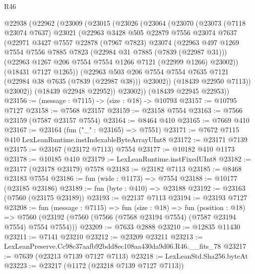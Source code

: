 \begin{lexlean}{R46}
\begin{coremodule}
  @22938
    (@22962
      (@23009
        (@23015
          (@23026
            (@23064
              (@23070
                (@23073
                  (@7118 @23074 @7637)
                  @23021
                  (@22963
                    @3428
                    @505
                    @22879
                    @7556
                    @23074
                    @7637
                    (@22971
                      @3427
                      @7557
                      @22878
                      (@7967 @7823)
                      @23074
                      (@22963
                        @497
                        @1269
                        @7554
                        @7556
                        @7885
                        @7823
                        (@22984 @31 @7885 (@7839 (@22987 @31)))
                        (@22963 @1267 @206 @7554 @7554 @1266 @7121 (@22999 @1266) @23002))
                      (@18431 @7127 @1265))
                    (@22963
                      @503
                      @206
                      @7554
                      @7554
                      @7635
                      @7121
                      (@22984 @38 @7635 (@7839 (@22987 @38)))
                      @23002))
                  (@18439 @22950 @7113))
                @23002))
            (@18439 @22948 @22952))
          @23002))
      (@18439 @22945 @22953))
@23156 := (message : @7115) -> (size : @18) -> @10793
@23157 := @10795 @7127
@23158 := @7568 @23157
@23159 := @23158 @7554
@23163 := @7566 @23159 (@7587 @23157 @7554)
@23164 := @8464 @410
@23165 := @7669 @410
@23167 := @23164 (fun ("_" : @23165) => @7551)
@23171 := @7672 @7115 @410 LexLeanRuntime.instIndexableByteArrayUInt8
@23172 := @23171 @7139
@23175 := @23167 (@23172 @7113) @7554
@23177 := @10182 @410 @1173
@23178 := @10185 @410
@23179 := LexLeanRuntime.instFixedUInt8
@23182 := @23177 (@23178 @23179) @7578
@23183 := @23182 @7113
@23185 := @8468 @23183 @7554
@23186 := fun (wide : @1173) => @7554
@23188 := @10177 (@23185 @23186)
@23189 := fun (byte : @410) => @23188
@23192 := @23163 (@7560 (@23175 @23189))
@23193 := @22137 @7113
@23194 := @23193 @7127
@23208 := fun (message : @7115) =>
  fun (size : @18) =>
  fun (position : @18) =>
  @7560 (@23192 (@7560 (@7566 (@7568 @23194 @7554) (@7587 @23194 @7554) @7554 @7554)))
@23209 := @7633 @2888
@23210 := @12835 @11430
@23211 := @7141 @23210
@23212 := @23209 @23211
@23213 := LexLeanPreserve.Cc98c37aafb92bdd8ec108aa430da9d06.R46.__fits_78
@23217 := @7639 (@23213 @7139 @7127 @7113)
@23218 := LexLeanStd.Sha256.byteAt
@23223 := @23217 (@1172 (@23218 @7139 @7127 @7113))

\end{coremodule}
\end{lexlean}
